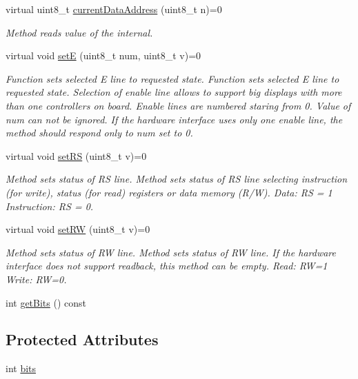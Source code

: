 \begin{DoxyCompactItemize}
virtual uint8\-\_\-t \hyperlink{class_h_d44780phy_a0e848e19d8a5c2c9605b7bf6bcc5394c}{current\-Data\-Address} (uint8\-\_\-t n)=0
\begin{DoxyCompactList}\small\item\em Method reads value of the internal. \end{DoxyCompactList}\item 
virtual void \hyperlink{class_h_d44780phy_aa6ec16b9e1ca1400b0c20815d1dd1938}{set\-E} (uint8\-\_\-t num, uint8\-\_\-t v)=0
\begin{DoxyCompactList}\small\item\em Function sets selected E line to requested state. Function sets selected E line to requested state. Selection of enable line allows to support big displays with more than one controllers on board. Enable lines are numbered staring from 0. Value of {\itshape num} can not be ignored. If the hardware interface uses only one enable line, the method should respond only to num set to 0. \end{DoxyCompactList}\item 
virtual void \hyperlink{class_h_d44780phy_a982aed1944e85dcabd0702af526ab2fe}{set\-R\-S} (uint8\-\_\-t v)=0
\begin{DoxyCompactList}\small\item\em Method sets status of R\-S line. Method sets status of R\-S line selecting instruction (for write), status (for read) registers or data memory (R/\-W). Data\-: R\-S = 1 Instruction\-: R\-S = 0. \end{DoxyCompactList}\item 
virtual void \hyperlink{class_h_d44780phy_a2885ef9168fc5a6c73233f8c7e9ed404}{set\-R\-W} (uint8\-\_\-t v)=0
\begin{DoxyCompactList}\small\item\em Method sets status of R\-W line. Method sets status of R\-W line. If the hardware interface does not support readback, this method can be empty. Read\-: R\-W=1 Write\-: R\-W=0. \end{DoxyCompactList}\item 
int \hyperlink{class_h_d44780phy_a621aad1a63c6fe9f061c0914c6afefe9}{get\-Bits} () const 
\end{DoxyCompactItemize}
\subsection*{Protected Attributes}
\begin{DoxyCompactItemize}
\item 
int \hyperlink{class_h_d44780phy_aa50b8a72c2a3418cda74b4693e8e1253}{bits}
\end{DoxyCompactItemize}


